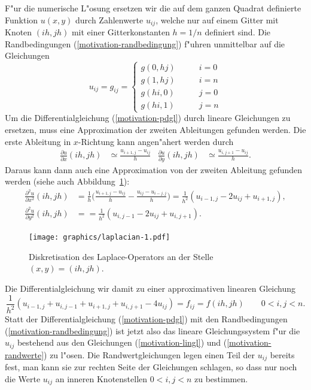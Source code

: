 F"ur die numerische L"osung ersetzen wir die auf dem ganzen Quadrat
definierte Funktion $u(x,y)$ durch Zahlenwerte $u_{ij}$, welche nur
auf einem Gitter mit Knoten $(ih, jh)$ mit einer Gitterkonstanten $h = 1/n$
definiert sind.
Die Randbedingungen (\ref{motivation-randbedingung}) f"uhren unmittelbar
auf die Gleichungen
\begin{equation}
u_{ij}=g_{ij}=\begin{cases}
g(0,hj)&\qquad i = 0\\
g(1,hj)&\qquad i = n\\
g(hi,0)&\qquad j = 0\\
g(hi,1)&\qquad j = n
\end{cases}
\label{motivation-randwerte}
\end{equation}
Um die Differentialgleichung (\ref{motivation-pdgl}) durch lineare Gleichungen
zu ersetzen, muss eine Approximation der zweiten Ableitungen
gefunden werden.
Die erste Ableitung in $x$-Richtung kann angen"ahert werden durch
\begin{align*}
\frac{\partial u}{\partial x}(ih,jh)&\simeq \frac{u_{i+1,j}-u_{ij}}h
&
\frac{\partial u}{\partial y}(ih,jh)&\simeq \frac{u_{i,j+1}-u_{ij}}h.
\end{align*}
Daraus kann dann auch eine Approximation von der zweiten Ableitung
gefunden werden (siehe auch Abbildung~\ref{algorithm:laplacian}):
\begin{align*}
\frac{\partial^2 u}{\partial x^2}(ih,jh)&=\frac1h\biggl(
\frac{u_{i+1,j}-u_{ij}}h-\frac{u_{ij}-u_{i-j,j}}h
\biggr)
=\frac1{h^2}(u_{i-1,j}-2u_{ij}+u_{i+1,j}),\\
\frac{\partial^2 u}{\partial y^2}(ih,jh)&=
=\frac1{h^2}(u_{i,j-1}-2u_{ij}+u_{i,j+1}).
\end{align*}
\begin{figure}
\begin{center}
\texttt{[image: graphics/laplacian-1.pdf]}
\end{center}
\caption{Diskretisation des Laplace-Operators an der Stelle $(x,y)=(ih, jh)$.
\label{algorithm:laplacian}}
\end{figure}
Die Differentialgleichung wir damit zu einer approximativen linearen
Gleichung 
\begin{equation}
\frac1{h^2}(u_{i-1,j}+u_{i,j-1}+u_{i+1,j}+u_{i,j+1}-4u_{ij})=f_{ij}=f(ih,jh)
\qquad 0<i,j<n.
\label{motivation-lingl}
\end{equation}
Statt der Differentialgleichung (\ref{motivation-pdgl}) mit den Randbedingungen
(\ref{motivation-randbedingung}) ist jetzt also das lineare Gleichungssystem
f"ur die $u_{ij}$ bestehend aus den Gleichungen (\ref{motivation-lingl}) und
(\ref{motivation-randwerte}) zu l"osen.
Die Randwertgleichungen legen einen Teil der $u_{ij}$ bereits fest,
man kann sie zur rechten Seite der Gleichungen schlagen,
so dass nur noch die Werte $u_{ij}$ an inneren Knotenstellen $0<i,j<n$
zu bestimmen.

